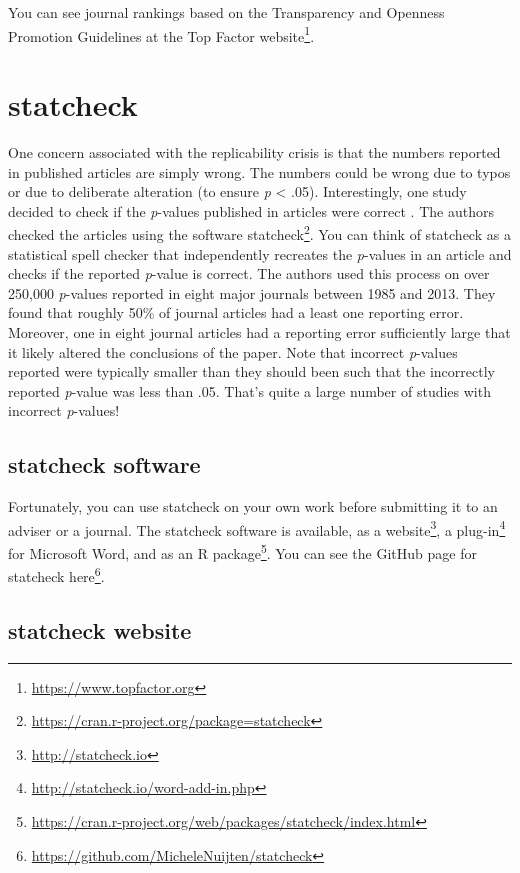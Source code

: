 \documentclass[
]{krantz}
\renewcommand{\href}[2]{#2\footnote{\url{#1}}}
\begin{document}
You can see journal rankings based on the Transparency and Openness Promotion Guidelines at the \href{https://www.topfactor.org}{Top Factor website}.

\hypertarget{statcheck}{%
\section{statcheck}\label{statcheck}}

One concern associated with the replicability crisis is that the numbers reported in published articles are simply wrong. The numbers could be wrong due to typos or due to deliberate alteration (to ensure \emph{p} \textless{} .05). Interestingly, one study decided to check if the \emph{p}-values published in articles were correct \citep{nuijten2016prevalence}. The authors checked the articles using the software \href{https://cran.r-project.org/package=statcheck}{statcheck}. You can think of statcheck as a statistical spell checker that independently recreates the \emph{p}-values in an article and checks if the reported \emph{p}-value is correct. The authors used this process on over 250,000 \emph{p}-values reported in eight major journals between 1985 and 2013. They found that roughly 50\% of journal articles had a least one reporting error. Moreover, one in eight journal articles had a reporting error sufficiently large that it likely altered the conclusions of the paper. Note that incorrect \emph{p}-values reported were typically smaller than they should been such that the incorrectly reported \emph{p}-value was less than .05. That's quite a large number of studies with incorrect \emph{p}-values!

\hypertarget{statcheck-software}{%
\subsection{statcheck software}\label{statcheck-software}}

Fortunately, you can use statcheck on your own work before submitting it to an adviser or a journal. The statcheck software is available, as a \href{http://statcheck.io}{website}, a \href{http://statcheck.io/word-add-in.php}{plug-in} for Microsoft Word, and as an \href{https://cran.r-project.org/web/packages/statcheck/index.html}{R package}. You can see the GitHub page for statcheck \href{https://github.com/MicheleNuijten/statcheck}{here}.

\hypertarget{statcheck-website}{%
\subsection{statcheck website}\label{statcheck-website}}
\end{document}
